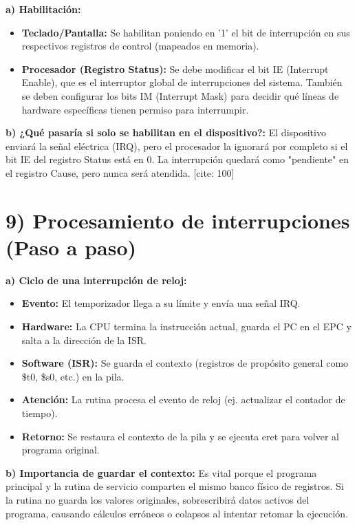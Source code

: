 \documentclass[12pt]{article}
\begin{document}
\begin{itemize}
\begin{enumerate}
\textbf{a) Habilitación:} 
\begin{itemize}
    \item \textbf{Teclado/Pantalla:} Se habilitan poniendo en '1' el bit de interrupción en sus respectivos registros de control (mapeados en memoria). 
    \item \textbf{Procesador (Registro Status):} Se debe modificar el bit IE (Interrupt Enable), que es el interruptor global de interrupciones del sistema. También se deben configurar los bits IM (Interrupt Mask) para decidir qué líneas de hardware específicas tienen permiso para interrumpir. 
\end{itemize}

\textbf{b) ¿Qué pasaría si solo se habilitan en el dispositivo?:} 
El dispositivo enviará la señal eléctrica (IRQ), pero el procesador la ignorará por completo si el bit IE del registro Status está en 0. La interrupción quedará como "pendiente" en el registro Cause, pero nunca será atendida. [cite: 100]

\vspace{1cm}

\section*{9) Procesamiento de interrupciones (Paso a paso)} 

\textbf{a) Ciclo de una interrupción de reloj:} 
\begin{itemize}
    \item \textbf{Evento:} El temporizador llega a su límite y envía una señal IRQ. 
    \item \textbf{Hardware:} La CPU termina la instrucción actual, guarda el PC en el EPC y salta a la dirección de la ISR. 
    \item \textbf{Software (ISR):} Se guarda el contexto (registros de propósito general como \$t0, \$s0, etc.) en la pila. 
    \item \textbf{Atención:} La rutina procesa el evento de reloj (ej. actualizar el contador de tiempo).
    \item \textbf{Retorno:} Se restaura el contexto de la pila y se ejecuta eret para volver al programa original. 
\end{itemize}

\textbf{b) Importancia de guardar el contexto:} 
Es vital porque el programa principal y la rutina de servicio comparten el mismo banco físico de registros.  Si la rutina no guarda los valores originales, sobrescribirá datos activos del programa, causando cálculos erróneos o colapsos al intentar retomar la ejecución. 


\end{enumerate}
\end{itemize}
\end{document}
